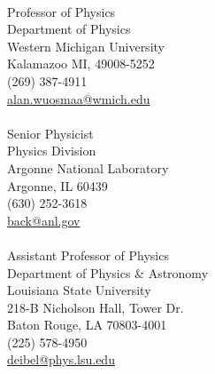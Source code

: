 {\setlength{\parindent}{0in}

\\
Professor of Physics\\
Department of Physics\\
Western Michigan University\\
Kalamazoo MI, 49008-5252\\
(269) 387-4911\\
\href{mailto:alan.wuosmaa@wmich.edu}{alan.wuosmaa@wmich.edu}\\

\\
Senior Physicist\\
Physics Division\\
Argonne National Laboratory\\
Argonne, IL 60439\\
(630) 252-3618\\
\href{mailto:back@anl.gov}{back@anl.gov}\\

\\
Assistant Professor of Physics\\
Department of Physics \& Astronomy\\
Louisiana State University\\
218-B Nicholson Hall, Tower Dr.\\
Baton Rouge, LA 70803-4001\\
(225) 578-4950\\
\href{mailto:deibel@phys.lsu.edu}{deibel@phys.lsu.edu}

%
%
}
